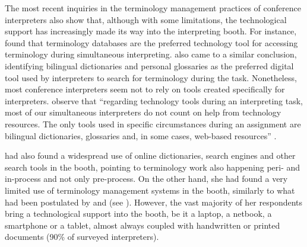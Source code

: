 The most recent inquiries in the terminology management practices of conference interpreters also show that, although with some limitations, the technological support has increasingly made its way into the interpreting booth. For instance, \citet{berber-irabien_information_2010} found that terminology databases are the preferred technology tool for accessing terminology during simultaneous interpreting. \citet{corpas_pastor_survey_2016} also came to a similar conclusion, identifying bilingual dictionaries and personal glossaries as the preferred digital tool used by interpreters to search for terminology during the task. Nonetheless, most conference interpreters seem not to rely on tools created specifically for interpreters. \citet{corpas_pastor_survey_2016} observe that ``regarding technology tools during an interpreting task, most of our simultaneous interpreters do not count on help from technology resources. The only tools used in specific circumstances during an assignment are bilingual dictionaries, glossaries and, in some cases, web-based resources'' \citep[26]{corpas_pastor_survey_2016}.

\citet{wagener2012vorbereitende} had also found a widespread use of online dictionaries, search engines and other search tools in the booth, pointing to terminology work also happening peri- and in-process and not only pre-process. On the other hand, she had found a very limited use of terminology management systems in the booth, similarly to what had been postulated by \citet{stoll_jenseits_2009} and \citet{rutten2011TMS} (see \citealt{wagener2012vorbereitende}). However, the vast majority of her respondents bring a technological support into the booth, be it a laptop, a netbook, a smartphone or a tablet, almost always coupled with handwritten or printed documents (90\% of surveyed interpreters).

